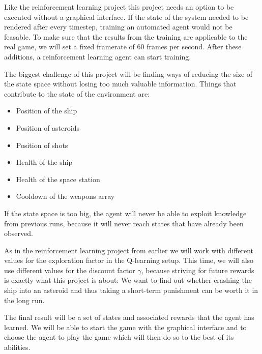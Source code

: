 \documentclass[a4paper,10pt]{article}
\begin{document}
Like the reinforcement learning project this project needs an option to be executed without a graphical interface.
If the state of the system needed to be rendered after every timestep, training an automated agent would not be feasable.
To make sure that the results from the training are applicable to the real game, we will set a fixed framerate of 60 frames per second.
After these additions, a reinforcement learning agent can start training.

The biggest challenge of this project will be finding ways of reducing the size of the state space without losing too much valuable information.
Things that contribute to the state of the environment are:
\begin{itemize}
 \item Position of the ship
 \item Position of asteroids
 \item Position of shots
 \item Health of the ship
 \item Health of the space station 
 \item Cooldown of the weapons array
\end{itemize}

If the state space is too big, the agent will never be able to exploit knowledge from previous runs, because it will never reach states that have already been observed.

As in the reinforcement learning project from earlier we will work with different values for the exploration factor in the Q-learning setup.
This time, we will also use different values for the discount factor $\gamma$, because striving for future rewards is exactly what this project is about: We want to find out whether crashing the ship into an asteroid and thus taking a short-term punishment can be worth it in the long run.

The final result will be a set of states and associated rewards that the agent has learned.
We will be able to start the game with the graphical interface and to choose the agent to play the game which will then do so to the best of its abilities.








\end{document}
